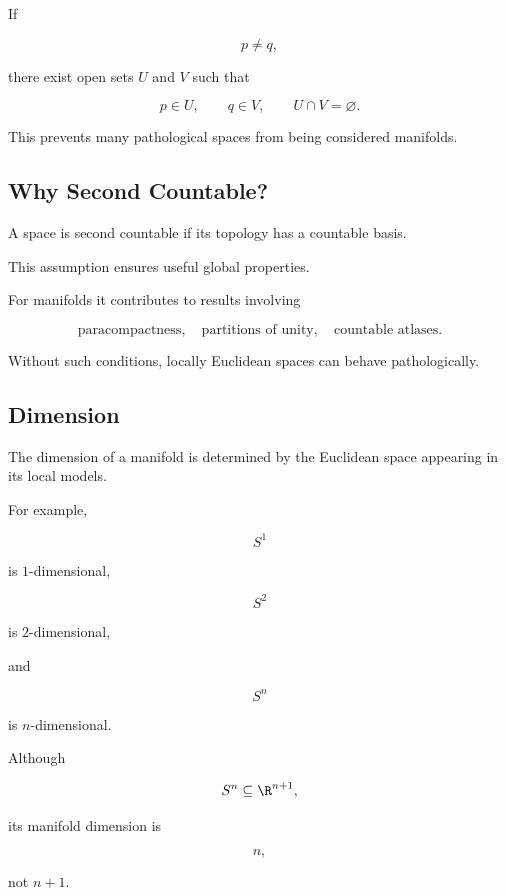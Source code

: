 If

\[
p\neq q,
\]

there exist open sets \(U\) and \(V\) such that

\[
p\in U,
\qquad
q\in V,
\qquad
U\cap V=\varnothing.
\]

This prevents many pathological spaces from being considered manifolds.

\subsection{Why Second Countable?}
\label{subsec:why-second-countable-manifolds}

A space is second countable if its topology has a countable basis.

This assumption ensures useful global properties.

For manifolds it contributes to results involving

\[
\boxed{
\text{paracompactness},
\quad
\text{partitions of unity},
\quad
\text{countable atlases}.
}
\]

Without such conditions, locally Euclidean spaces can behave pathologically.

\subsection{Dimension}
\label{subsec:manifold-dimension}

The dimension of a manifold is determined by the Euclidean space appearing
in its local models.

For example,

\[
S^1
\]

is \(1\)-dimensional,

\[
S^2
\]

is \(2\)-dimensional,

and

\[
S^n
\]

is \(n\)-dimensional.

Although

\[
S^n\subseteq\R^{n+1},
\]

its manifold dimension is

\[
\boxed{
n,
}
\]

not \(n+1\).

